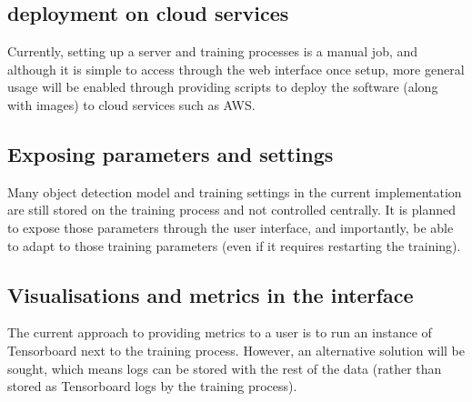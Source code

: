 \subsection {deployment on cloud services}
Currently, setting up a server and training processes is a manual job, and although it is simple to access through the web interface once setup, more general usage will be enabled through providing scripts to deploy the software (along with images) to cloud services such as \gls{AWS}. 

\subsection {Exposing parameters and settings}
 Many object detection model and training settings in the current implementation are still stored on the training process and not controlled centrally. It is planned to expose those parameters through the user interface, and importantly, be able to adapt to those training parameters (even if it requires restarting the training).

\subsection{Visualisations and metrics in the interface}

The current approach to providing metrics to a user is to run an instance of Tensorboard next to the training process. However, an alternative solution will be sought, which means logs can be stored with the rest of the data (rather than stored as Tensorboard logs by the training process).

